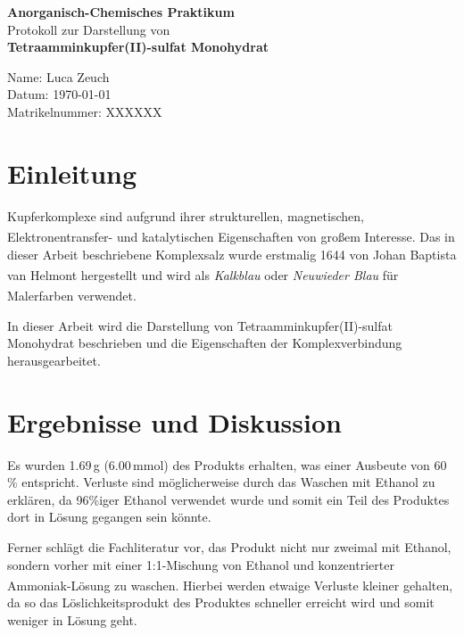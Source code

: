 \documentclass[12pt,a4paper]{scrartcl}
\begin{document}
\begin{titlepage} %
  \vspace*{6cm}
  \begin{center} %
    \Large{\textbf{Anorganisch-Chemisches Praktikum}} \\
    \vspace*{1cm}
    \Large{Protokoll zur Darstellung von} \\
    \vspace*{1cm}
    \large{\textbf{Tetraamminkupfer(II)-sulfat Monohydrat} }
  \end{center} %
  \vspace*{5cm}
  Name: Luca Zeuch \\
  Datum: \today \\
  Matrikelnummer: XXXXXX \\
\end{titlepage} %


\section{Einleitung} %
Kupferkomplexe sind aufgrund ihrer strukturellen, magnetischen, Elektronentransfer- und katalytischen
Eigenschaften\textsuperscript{\cite{Singh:a12030}} von großem Interesse. Das in dieser Arbeit beschriebene Komplexsalz
wurde erstmalig 1644 von Johan Baptista van Helmont hergestellt\textsuperscript{\cite{meyer1905meyers}} und wird als
\textit{Kalkblau} oder \textit{Neuwieder Blau} für Malerfarben verwendet.\textsuperscript{\cite{brockhaus}}

In dieser Arbeit wird die Darstellung von Tetraamminkupfer(II)-sulfat Monohydrat beschrieben und die Eigenschaften der
Komplexverbindung herausgearbeitet.

\section{Ergebnisse und Diskussion} %
Es wurden 1.69\,g (6.00\,mmol) des Produkts erhalten, was einer Ausbeute von 60 \% entspricht. Verluste sind
möglicherweise durch das Waschen mit Ethanol zu erklären, da 96\%iger Ethanol verwendet wurde und somit ein Teil des
Produktes dort in Lösung gegangen sein könnte.

Ferner schlägt die Fachliteratur vor, das Produkt nicht nur zweimal mit Ethanol, sondern vorher mit einer
1:1-Mischung von Ethanol und konzentrierter Ammoniak-Lösung zu waschen.\textsuperscript{\cite{brauer1965handbook}}
Hierbei werden etwaige Verluste kleiner gehalten, da so das Lös\-lich\-keits\-pro\-dukt des Produktes schneller erreicht wird
und somit weniger in Lösung geht.
\end{document}
